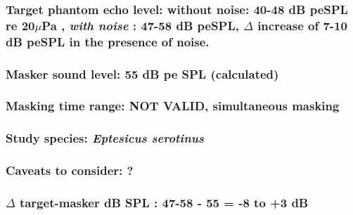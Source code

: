 \documentclass[11pt]{article}
\begin{document}
\hypertarget{target-phantom-echo-level-without-noise-40-48-db-pespl-re-20mupa-with-noise-47-58-db-pespl-delta-increase-of-7-10-db-pespl-in-the-presence-of-noise.}{%
\subsubsection{\texorpdfstring{Target phantom echo level: without noise:
40-48 dB peSPL re 20\(\mu\)Pa , \emph{with noise} : 47-58 dB peSPL,
\(\Delta\) increase of 7-10 dB peSPL in the presence of
noise.}{Target phantom echo level: without noise: 40-48 dB peSPL re 20\textbackslash{}muPa , with noise : 47-58 dB peSPL, \textbackslash{}Delta increase of 7-10 dB peSPL in the presence of noise.}}\label{target-phantom-echo-level-without-noise-40-48-db-pespl-re-20mupa-with-noise-47-58-db-pespl-delta-increase-of-7-10-db-pespl-in-the-presence-of-noise.}}

\hypertarget{masker-sound-level-55-db-pe-spl-calculated}{%
\subsubsection{Masker sound level: 55 dB pe SPL
(calculated)}\label{masker-sound-level-55-db-pe-spl-calculated}}

\hypertarget{masking-time-range-not-valid-simultaneous-masking}{%
\subsubsection{Masking time range: NOT VALID, simultaneous
masking}\label{masking-time-range-not-valid-simultaneous-masking}}

\hypertarget{study-species-eptesicus-serotinus}{%
\subsubsection{\texorpdfstring{Study species: \emph{Eptesicus
serotinus}}{Study species: Eptesicus serotinus}}\label{study-species-eptesicus-serotinus}}

\hypertarget{caveats-to-consider}{%
\subsubsection{Caveats to consider: ?}\label{caveats-to-consider}}

\hypertarget{delta-target-masker-db-spl-47-58---55--8-to-3-db}{%
\subsubsection{\texorpdfstring{\(\Delta\) target-masker dB SPL : 47-58 -
55 = -8 to +3
dB}{\textbackslash{}Delta target-masker dB SPL : 47-58 - 55 = -8 to +3 dB}}\label{delta-target-masker-db-spl-47-58---55--8-to-3-db}}
\end{document}

